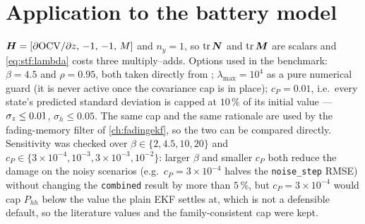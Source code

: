 \section{Application to the battery model}
$\bm{H} = [\partial\mathrm{OCV}/\partial z,\,-1,\,-1,\,M]$ and $n_y=1$, so $\operatorname{tr}\bm{N}$ and $\operatorname{tr}\bm{M}$ are scalars
and \eqref{eq:stf:lambda} costs three multiply--adds.  Options used in the benchmark:
$\beta = 4.5$ and $\rho = 0.95$, both taken directly from \cite{zhoufrank1996stf};
$\lambda_{\max}=10^4$ as a pure numerical guard (it is never active once the covariance cap is in
place); $c_P = 0.01$, i.e.\ every state's predicted standard deviation is capped at $10\,\%$ of its
initial value --- $\sigma_z\le 0.01$, $\sigma_h\le 0.05$.  The same cap and the same rationale are
used by the fading-memory filter of \cref{ch:fadingekf}, so the two can be compared directly.
Sensitivity was checked over $\beta\in\{2,4.5,10,20\}$ and $c_P\in\{3\times10^{-4},10^{-3},3\times10^{-3},10^{-2}\}$:
larger $\beta$ and smaller $c_P$ both reduce the damage on the noisy scenarios
(e.g.\ $c_P=3\times10^{-4}$ halves the \texttt{noise\_step} RMSE) without changing the
\texttt{combined} result by more than $5\,\%$, but $c_P=3\times10^{-4}$ would cap $P_{hh}$ below the
value the plain EKF settles at, which is not a defensible default, so the literature values and the
family-consistent cap were kept.

